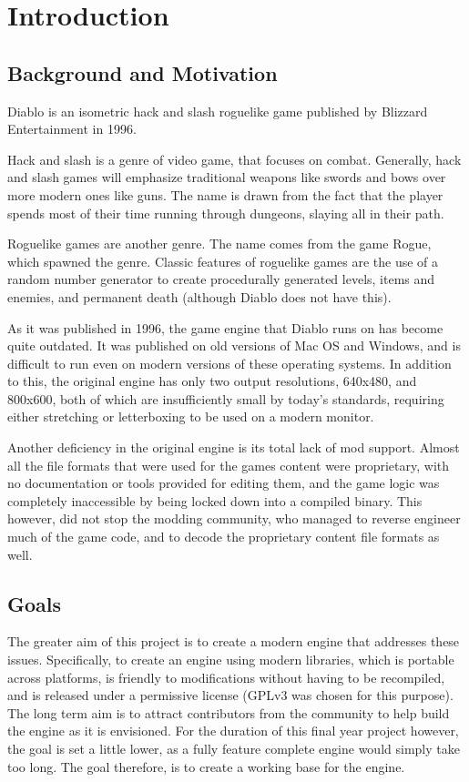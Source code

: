 \chapter{Introduction}
	\section{Background and Motivation}
	Diablo is an isometric hack and slash roguelike game published by Blizzard Entertainment in 1996\cite{diablo}.
	
	Hack and slash is a genre of video game, that focuses on combat. Generally, hack and slash games will emphasize   traditional weapons like swords and bows over more modern ones like guns. The name is drawn from the fact that the player spends most of their time running through dungeons, slaying all in their path.
	
	Roguelike games are another genre. The name comes from the game Rogue\cite{rogue}, which spawned the genre.
	Classic features of roguelike games are the use of a random number generator to create procedurally generated levels, items and enemies, and permanent death (although Diablo does not have this).
	
	As it was published in 1996, the game engine that Diablo runs on has become quite outdated. It was published on old versions of Mac OS and Windows, and is difficult to run even on modern versions of these operating systems.
	In addition to this, the original engine has only two output resolutions, 640x480, and 800x600, both of which are insufficiently small by today's standards, requiring either stretching or letterboxing to be used on a modern monitor.
	
	Another deficiency in the original engine is its total lack of mod support. Almost all the file formats that were used for the games content were proprietary, with no documentation or tools provided for editing them, and the game logic was completely inaccessible by being locked down into a compiled binary. This however, did not stop the modding community, who managed to reverse engineer much of the game code, and to decode the proprietary content file formats as well.

	\section{Goals}	
	The greater aim of this project is to create a modern engine that addresses these issues. Specifically, to create an engine using modern libraries, which is portable across platforms, is friendly to modifications without having to be recompiled, and is released under a permissive license (GPLv3 was chosen for this purpose).
	The long term aim is to attract contributors from the community to help build the engine as it is envisioned. For the duration of this final year project however, the goal is set a little lower, as a fully feature complete engine would simply take too long. The goal therefore, is to create a working base for the engine.
	
